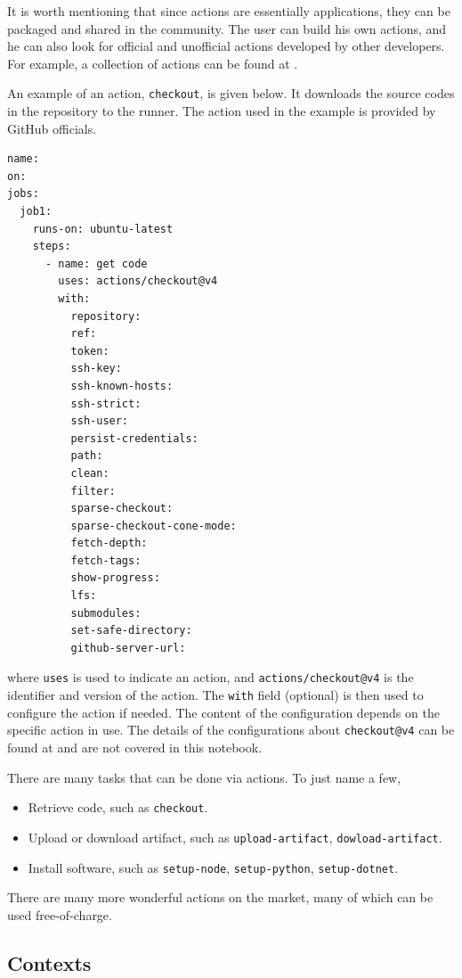 It is worth mentioning that since actions are essentially applications, they can be packaged and shared in the community. The user can build his own actions, and he can also look for official and unofficial actions developed by other developers. For example, a collection of actions can be found at \cite{git2025actions}.

An example of an action, \verb|checkout|, is given below. It downloads the source codes in the repository to the runner. The action used in the example is provided by GitHub officials.
\begin{lstlisting}
name:
on:
jobs:
  job1:
    runs-on: ubuntu-latest
    steps:
      - name: get code
        uses: actions/checkout@v4
        with:
          repository:
          ref:
          token:
          ssh-key:
          ssh-known-hosts:
          ssh-strict:
          ssh-user:
          persist-credentials:
          path:
          clean:
          filter:
          sparse-checkout:
          sparse-checkout-cone-mode:
          fetch-depth:
          fetch-tags:
          show-progress:
          lfs:
          submodules:
          set-safe-directory:
          github-server-url:
\end{lstlisting}
where \verb|uses| is used to indicate an action, and \verb|actions/checkout@v4| is the identifier and version of the action. The \verb|with| field (optional) is then used to configure the action if needed. The content of the configuration depends on the specific action in use. The details of the configurations about \verb|checkout@v4| can be found at \cite{git2025actions} and are not covered in this notebook. 

There are many tasks that can be done via actions. To just name a few,
\begin{itemize}
  \item Retrieve code, such as \verb|checkout|.
  \item Upload or download artifact, such as \verb|upload-artifact|, \verb|dowload-artifact|.
  \item Install software, such as \verb|setup-node|, \verb|setup-python|, \verb|setup-dotnet|.
\end{itemize}
There are many more wonderful actions on the market, many of which can be used free-of-charge.

\subsection{Contexts}

